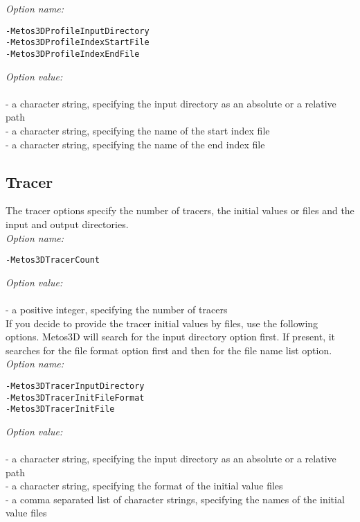 \documentclass{article}
\begin{document}
\emph{Option name:}
\begin{verbatim}
-Metos3DProfileInputDirectory
-Metos3DProfileIndexStartFile
-Metos3DProfileIndexEndFile
\end{verbatim}

\emph{Option value:} \\
\vspace{-0.3cm}\\
- a character string, specifying the input directory as an absolute or a relative path \\
- a character string, specifying the name of the start index file \\
- a character string, specifying the name of the end index file

%
%
\subsection{Tracer}

The tracer options specify the number of tracers, the initial values or files and
the input and output directories. \\

\emph{Option name:}
\begin{verbatim}
-Metos3DTracerCount
\end{verbatim}

\emph{Option value:} \\
\vspace{-0.3cm}\\
- a positive integer, specifying the number of tracers \\

If you decide to provide the tracer initial values by files,
use the following options. Metos3D will search for the input directory option
first. If present, it searches for the file format option first and then
for the file name list option. \\

\emph{Option name:}
\begin{verbatim}
-Metos3DTracerInputDirectory
-Metos3DTracerInitFileFormat
-Metos3DTracerInitFile                              
\end{verbatim}

\emph{Option value:} \\
\vspace{-0.3cm}\\
- a character string, specifying the input directory as an absolute or a relative path \\
- a character string, specifying the format of the initial value files \\
- a comma separated list of character strings, specifying the names of the initial value files \\
\end{document}

